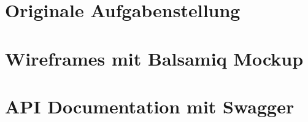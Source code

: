 \section{Originale Aufgabenstellung}\label{originaleaufgabenstellung}
%
\section{Wireframes mit Balsamiq Mockup}\label{Mockups}
%
\section{API Documentation mit Swagger}\label{SwaggerDokumentation}
%
